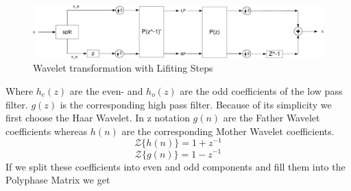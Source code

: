\begin{refsection}
\begin{figure}
	\centering
	\includegraphics[width=\textwidth]{images/lifting_step_wavelet.pdf}
	\caption{Wavelet transformation with Lifiting Steps \label{fpga:lstp_wavelet}}
\end{figure}
Where $h_e(z)$ are the even- and $h_o(z)$ are the odd coefficients of the low pass filter. $g(z)$ is the corresponding high pass filter. 
Because of its simplicity we first choose the Haar Wavelet. In z notation
$g(n)$ are the Father Wavelet coefficients whereas $h(n)$ are the corresponding Mother Wavelet coefficients. 
\begin{equation}
{\mathcal {Z}} \{h(n)\} = 1 + z^{-1}
\end{equation}
\begin{equation}
{\mathcal {Z}} \{g(n)\} = 1 - z^{-1}
\end{equation}
If we split these coefficients into even and odd components and fill them into the Polyphase Matrix we get 


\end{refsection}
